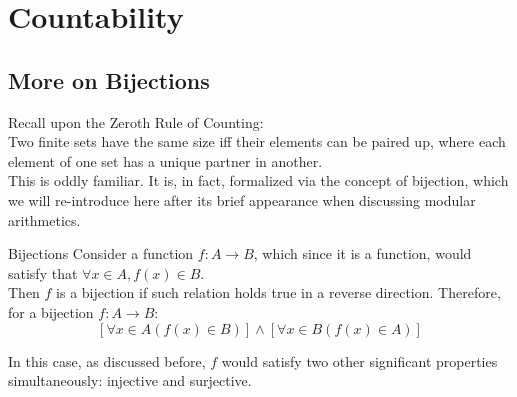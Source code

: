 \chapter{Countability}

\section{More on Bijections}
Recall upon the Zeroth Rule of Counting: \\
Two finite sets have the same size iff their elements can be paired up, where each element of one set has a unique partner in another. \\
This is oddly familiar. It is, in fact, formalized via the concept of bijection, which we will re-introduce here after its brief appearance when discussing modular arithmetics.
\begin{ln-define}{Bijections}{}
    Consider a function $f: A \rightarrow B$, which since it is a function, would satisfy that $\forall x \in A, f(x) \in B$. \\
    Then $f$ is a bijection if such relation holds true in a reverse direction. Therefore, for a bijection $f: A \rightarrow B$:
    \[[\forall x \in A (f(x) \in B)] \land [\forall x \in B (f(x) \in A)]\]
\end{ln-define}
In this case, as discussed before, $f$ would satisfy two other significant properties simultaneously: injective and surjective.
